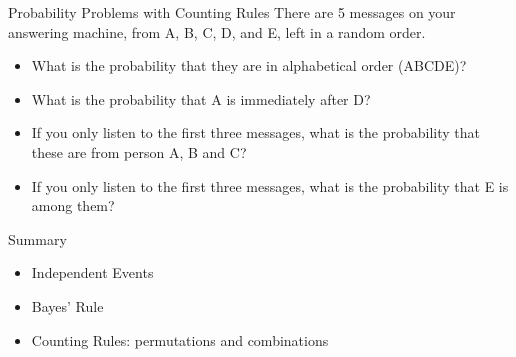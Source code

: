 \documentclass{beamer}
\newcommand{\ignore}[1]{}
\begin{document}
\begin{frame}{Probability Problems with Counting Rules}
There are 5 messages on your answering machine, from A, B, C, D, and E, left in a random order.
    \begin{itemize}
        \item What is the probability that they are in alphabetical order (ABCDE)? 
            \item What is the probability that A is immediately after D?
            \item If you only listen to the first three messages, what is the probability that these are from person A, B and C?
\item If you only listen to the first three messages, what is the probability that E is among them?
    \end{itemize}
\end{frame}

\begin{frame}{Summary}
\begin{itemize}
\item Independent Events
\item Bayes' Rule
\item Counting Rules: permutations and combinations
\end{itemize}
\end{frame}



\ignore{
\begin{frame}{}
\begin{itemize}
\item 
\end{itemize}
\end{frame}

\begin{frame}{Time Series Plot}
\begin{figure}
    \caption{}
    \texttt{[image: figures/coindesk-bpi-chart]}
\end{figure}
\let\thefootnote\relax\footnotetext{\tiny{* Plot from Coindesk.com}}
\end{frame}

\begin{frame}{}
\begin{itemize}
\item 
\end{itemize}
\end{frame}

\vspace{\stretch{0.5}}

\begin{block}{}
\end{block}


}
\end{document}
